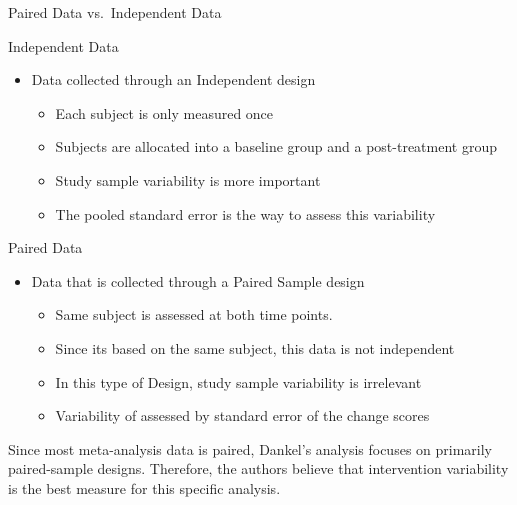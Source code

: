 \documentclass[
  ignorenonframetext,
  aspectratio=169,
]{beamer}
\providecommand{\tightlist}{%
  \setlength{\itemsep}{0pt}\setlength{\parskip}{0pt}}
\begin{document}
\begin{frame}{Paired Data vs.~Independent Data}
\protect\hypertarget{paired-data-vs.-independent-data}{}
\begin{block}{Independent Data}
\protect\hypertarget{independent-data}{}
\begin{itemize}
\tightlist
\item
  Data collected through an Independent design

  \begin{itemize}
  \tightlist
  \item
    Each subject is only measured once
  \item
    Subjects are allocated into a baseline group and a post-treatment
    group
  \item
    Study sample variability is more important
  \item
    The pooled standard error is the way to assess this variability
  \end{itemize}
\end{itemize}
\end{block}

\begin{block}{Paired Data}
\protect\hypertarget{paired-data}{}
\begin{itemize}
\tightlist
\item
  Data that is collected through a Paired Sample design

  \begin{itemize}
  \tightlist
  \item
    Same subject is assessed at both time points.
  \item
    Since its based on the same subject, this data is not independent
  \item
    In this type of Design, study sample variability is irrelevant
  \item
    Variability of assessed by standard error of the change scores
  \end{itemize}
\end{itemize}

Since most meta-analysis data is paired, Dankel's analysis focuses on
primarily paired-sample designs. Therefore, the authors believe that
intervention variability is the best measure for this specific analysis.
\end{block}
\end{frame}
\end{document}
